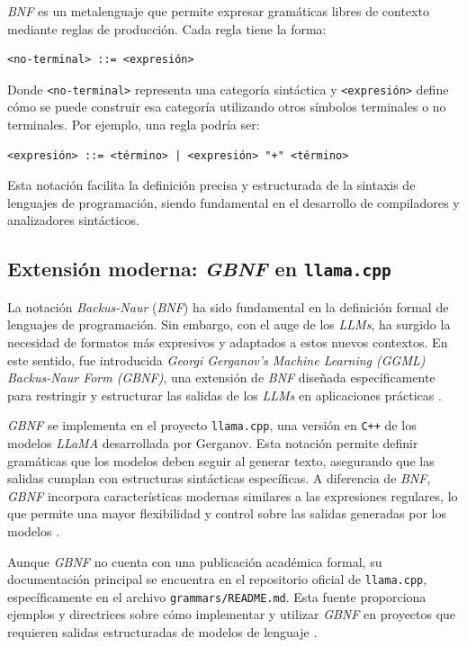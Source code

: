 \textit{BNF} es un metalenguaje que permite expresar gramáticas libres de contexto mediante reglas de producción. Cada regla tiene la forma:

\begin{verbatim}
<no-terminal> ::= <expresión>
\end{verbatim}

Donde \texttt{<no-terminal>} representa una categoría sintáctica y \texttt{<expresión>} define cómo se puede construir esa categoría utilizando otros símbolos terminales o no terminales. Por ejemplo, una regla podría ser:

\begin{verbatim}
<expresión> ::= <término> | <expresión> "+" <término>
\end{verbatim}

Esta notación facilita la definición precisa y estructurada de la sintaxis de lenguajes de programación, siendo fundamental en el desarrollo de compiladores y analizadores sintácticos.

\subsection{Extensión moderna: \textit{GBNF} en \texttt{llama.cpp}}

La notación \textit{Backus-Naur} (\textit{BNF}) ha sido fundamental en la definición formal de lenguajes de programación. Sin embargo, con el auge de los \textit{LLMs}, ha surgido la necesidad de formatos más expresivos y adaptados a estos nuevos contextos. En este sentido, fue introducida \textit{Georgi Gerganov's Machine Learning (GGML) Backus-Naur Form (GBNF)}, una extensión de \textit{BNF} diseñada específicamente para restringir y estructurar las salidas de los \textit{LLMs} en aplicaciones prácticas \parencite{ggml2023gbnf}.

\textit{GBNF} se implementa en el proyecto \texttt{llama.cpp}, una versión en \texttt{C++} de los modelos \textit{LLaMA} desarrollada por Gerganov. Esta notación permite definir gramáticas que los modelos deben seguir al generar texto, asegurando que las salidas cumplan con estructuras sintácticas específicas. A diferencia de \textit{BNF}, \textit{GBNF} incorpora características modernas similares a las expresiones regulares, lo que permite una mayor flexibilidad y control sobre las salidas generadas por los modelos \parencite{ggml2023gbnf}.

Aunque \textit{GBNF} no cuenta con una publicación académica formal, su documentación principal se encuentra en el repositorio oficial de \texttt{llama.cpp}, específicamente en el archivo \texttt{grammars/README.md}. Esta fuente proporciona ejemplos y directrices sobre cómo implementar y utilizar \textit{GBNF} en proyectos que requieren salidas estructuradas de modelos de lenguaje \parencite{ggml2023gbnf}.

